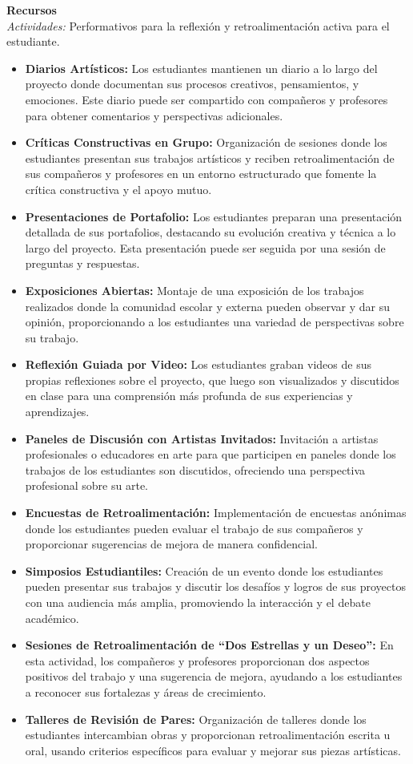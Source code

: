 {\large \textbf{Recursos}}\\
\textit{Actividades: } Performativos para la reflexión y retroalimentación activa para el estudiante.  
\begin{itemize}
    \item \textbf{Diarios Artísticos:} Los estudiantes mantienen un diario a lo largo del proyecto donde documentan sus procesos creativos, pensamientos, y emociones. Este diario puede ser compartido con compañeros y profesores para obtener comentarios y perspectivas adicionales.
    \item \textbf{Críticas Constructivas en Grupo:} Organización de sesiones donde los estudiantes presentan sus trabajos artísticos y reciben retroalimentación de sus compañeros y profesores en un entorno estructurado que fomente la crítica constructiva y el apoyo mutuo.
    \item \textbf{Presentaciones de Portafolio:} Los estudiantes preparan una presentación detallada de sus portafolios, destacando su evolución creativa y técnica a lo largo del proyecto. Esta presentación puede ser seguida por una sesión de preguntas y respuestas.
    \item \textbf{Exposiciones Abiertas:} Montaje de una exposición de los trabajos realizados donde la comunidad escolar y externa pueden observar y dar su opinión, proporcionando a los estudiantes una variedad de perspectivas sobre su trabajo.
    \item \textbf{Reflexión Guiada por Video:} Los estudiantes graban videos de sus propias reflexiones sobre el proyecto, que luego son visualizados y discutidos en clase para una comprensión más profunda de sus experiencias y aprendizajes.
    \item \textbf{Paneles de Discusión con Artistas Invitados:} Invitación a artistas profesionales o educadores en arte para que participen en paneles donde los trabajos de los estudiantes son discutidos, ofreciendo una perspectiva profesional sobre su arte.
    \item \textbf{Encuestas de Retroalimentación:} Implementación de encuestas anónimas donde los estudiantes pueden evaluar el trabajo de sus compañeros y proporcionar sugerencias de mejora de manera confidencial.
    \item \textbf{Simposios Estudiantiles:} Creación de un evento donde los estudiantes pueden presentar sus trabajos y discutir los desafíos y logros de sus proyectos con una audiencia más amplia, promoviendo la interacción y el debate académico.
    \item \textbf{Sesiones de Retroalimentación de ``Dos Estrellas y un Deseo'':} En esta actividad, los compañeros y profesores proporcionan dos aspectos positivos del trabajo y una sugerencia de mejora, ayudando a los estudiantes a reconocer sus fortalezas y áreas de crecimiento.
    \item \textbf{Talleres de Revisión de Pares:} Organización de talleres donde los estudiantes intercambian obras y proporcionan retroalimentación escrita u oral, usando criterios específicos para evaluar y mejorar sus piezas artísticas.
\end{itemize}



